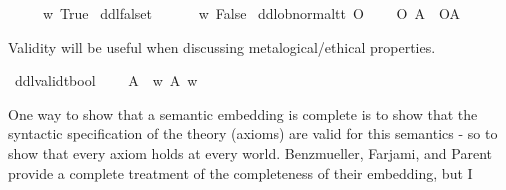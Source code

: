 \begin{isabellebody}
\ \ \ {\isachardoublequoteopen}\isactrlbold {\isasymtop}\ {\isasymequiv}\ {\isasymlambda}w{\isachardot}\ True{\isachardoublequoteclose}\isanewline
{}\isamarkupfalse%
\ ddlfalse{\isacharcolon}{\isacharcolon}{\isachardoublequoteopen}t{\isachardoublequoteclose}\ {\isacharparenleft}{\isachardoublequoteopen}\isactrlbold {\isasymbottom}{\isachardoublequoteclose}{\isacharparenright}\isanewline
\ \ \ {\isachardoublequoteopen}\isactrlbold {\isasymbottom}\ {\isasymequiv}\ {\isasymlambda}w{\isachardot}\ False{\isachardoublequoteclose}\isanewline
{}\isamarkupfalse%
\ ddlob{\isacharunderscore}normal{\isacharcolon}{\isacharcolon}{\isachardoublequoteopen}t{\isasymRightarrow}t{\isachardoublequoteclose}\ {\isacharparenleft}{\isachardoublequoteopen}O\ {\isacharbraceleft}{\isacharunderscore}{\isacharbraceright}{\isachardoublequoteclose}{\isacharparenright}\isanewline
\ \ \ {\isachardoublequoteopen}{\isacharparenleft}O\ {\isacharbraceleft}A{\isacharbraceright}{\isacharparenright}\ {\isasymequiv}\ {\isacharparenleft}O{\isacharbraceleft}A{\isacharbar}\isactrlbold {\isasymtop}{\isacharbraceright}{\isacharparenright}\ {\isachardoublequoteclose}\isanewline
%
%
\begin{isamarkuptext}%
Validity will be useful when discussing metalogical/ethical properties.%
\end{isamarkuptext}\isamarkuptrue%
\isamarkupfalse%
\ ddlvalid{\isacharcolon}{\isacharcolon}{\isachardoublequoteopen}t{\isasymRightarrow}bool{\isachardoublequoteclose}\ {\isacharparenleft}{\isachardoublequoteopen}{\isasymTurnstile}{\isacharunderscore}{\isachardoublequoteclose}{\isacharparenright}\isanewline
\ \ \ {\isachardoublequoteopen}{\isasymTurnstile}A\ {\isasymequiv}\ {\isasymforall}w{\isachardot}\ A\ w{\isachardoublequoteclose}\isanewline
%
\isadelimdocument
%
\endisadelimdocument
%
\isatagdocument
%
\isamarkuptrue%
%
\endisatagdocument
{\isafolddocument}%
%
\isadelimdocument
%
\endisadelimdocument
%
\begin{isamarkuptext}%
One way to show that a semantic embedding is complete is to show that the syntactic specification
of the theory (axioms) are valid for this semantics - so to show that every axiom holds at every 
world. Benzmueller, Farjami, and Parent provide a complete treatment of the completeness of their embedding, but I 

\end{isamarkuptext}
\end{isabellebody}
